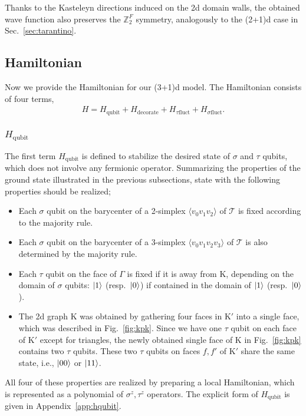 \documentclass[12pt]{article}
\numberwithin{equation}{section}
\begin{document}
Thanks to the Kasteleyn directions induced on the 2d domain walls, the obtained wave function also preserves the $\mathbb{Z}_2^F$ symmetry, analogously to the (2+1)d case in Sec.~\ref{sec:tarantino}.



\subsection{Hamiltonian}
\label{sec:3dham}
Now we provide the Hamiltonian for our (3+1)d model. 
The Hamiltonian consists of four terms,
\begin{align}
    H= H_{\mathrm{qubit}}+H_{\mathrm{decorate}}+H_{\tau\mathrm{fluct}}+H_{\sigma\mathrm{fluct}}.
    \label{eq:ham}
\end{align}

\subsubsection{$H_{\mathrm{qubit}}$}

The first term $H_{\mathrm{qubit}}$ is defined to stabilize the desired state of $\sigma$ and $\tau$ qubits, which does not involve any fermionic operator. Summarizing the properties of the ground state illustrated in the previous subsections, state with the following properties should be realized;

\begin{itemize}
    \item Each $\sigma$ qubit on the barycenter of a 2-simplex $\langle v_0v_1v_2\rangle$ of $\mathcal{T}$ is fixed according to the majority rule.
    
    \item Each $\sigma$ qubit on the barycenter of a 3-simplex $\langle v_0v_1v_2v_3\rangle$ of $\mathcal{T}$ is also determined by the majority rule. 
    
    \item Each $\tau$ qubit on the face of $\Gamma$ is fixed if it is away from $\mathrm{K}$, depending on the domain of $\sigma$ qubits: $\ket{1}$ (resp.~$\ket{0}$) if contained in the domain of $\ket{1}$ (resp.~$\ket{0}$).
    
    \item The 2d graph $\mathrm{K}$ was obtained by gathering four faces in $\mathrm{K}'$ into a single face, which was described in Fig.~\ref{fig:kpk}. 
    Since we have one $\tau$ qubit on each face of $\mathrm{K}'$ except for triangles, the newly obtained single face of $\mathrm{K}$ in Fig.~\ref{fig:kpk} contains two $\tau$ qubits.
    These two $\tau$ qubits on faces $f, f'$ of $\mathrm{K}'$ share the same state, i.e., $\ket{00}$ or $\ket{11}$. 
\end{itemize}
All four of these properties are realized by preparing a local Hamiltonian, which is represented as a polynomial of $\sigma^z, \tau^z$ operators. The explicit form of $H_{\mathrm{qubit}}$ is given in Appendix~\ref{app:hqubit}.
\end{document}

